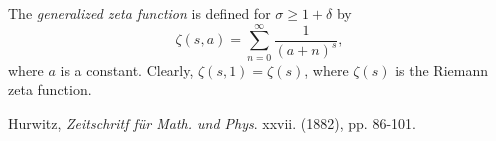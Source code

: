 \documentclass[12pt]{article}
\begin{document}
The \emph{generalized zeta function} is defined for $\sigma \geqslant 1+\delta$
by
$$
\zeta(s,a) = \sum_{n=0}^{\infty} \frac{1}{(a+n)^s},
$$
where $a$ is a constant. Clearly, $\zeta(s,1)= \zeta(s)$, where $\zeta(s)$ is the Riemann zeta function.

\begin{thebibliography}{99}
Hurwitz, \emph{Zeitschritf f\"ur Math. und Phys}. xxvii. (1882), pp. 86-101.
\end{thebibliography}
\end{document}
